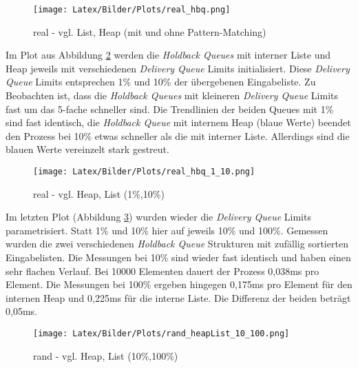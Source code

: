 \begin{figure}[htbp]
\begin{center}
\texttt{[image: Latex/Bilder/Plots/real\_hbq.png]}
\caption{\label{fig:real_hbqAll} real - vgl. List, Heap (mit und ohne Pattern-Matching)} 
\end{center}
\end{figure}

Im Plot aus Abbildung \ref{fig:real_heapListPercent} werden die \textit{Holdback Queues} mit interner Liste und Heap jeweils mit verschiedenen \textit{Delivery Queue} Limits initialisiert. Diese \textit{Delivery Queue} Limits entsprechen 1\% und 10\% der übergebenen Eingabeliste. Zu Beobachten ist, dass die \textit{Holdback Queues} mit kleineren \textit{Delivery Queue} Limits fast um das 5-fache schneller sind. Die Trendlinien der beiden Queues mit 1\% sind fast identisch, die \textit{Holdback Queue} mit internem Heap (blaue Werte) beendet den Prozess bei 10\% etwas schneller als die mit interner Liste. Allerdings sind die blauen Werte vereinzelt stark gestreut. 

\begin{figure}[htbp]
\begin{center}
\texttt{[image: Latex/Bilder/Plots/real\_hbq\_1\_10.png]}
\caption{\label{fig:real_heapListPercent} real - vgl. Heap, List (1\%,10\%)} 
\end{center}
\end{figure}

\newpage
Im letzten Plot (Abbildung \ref{fig:rand_heapListPercent}) wurden wieder die \textit{Delivery Queue} Limits parametrisiert. Statt 1\% und 10\% hier auf jeweils 10\% und 100\%. Gemessen wurden die zwei verschiedenen \textit{Holdback Queue} Strukturen mit zufällig sortierten Eingabelisten. Die Messungen bei 10\% sind wieder fast identisch und haben einen sehr flachen Verlauf. Bei 10000 Elementen dauert der Prozess 0,038ms pro Element. Die Messungen bei 100\% ergeben hingegen 0,175ms pro Element für den internen Heap und 0,225ms für die interne Liste. Die Differenz der beiden beträgt 0,05ms.

\begin{figure}[htbp]
\begin{center}
\texttt{[image: Latex/Bilder/Plots/rand\_heapList\_10\_100.png]}
\caption{\label{fig:rand_heapListPercent} rand - vgl. Heap, List (10\%,100\%)} 
\end{center}
\end{figure}